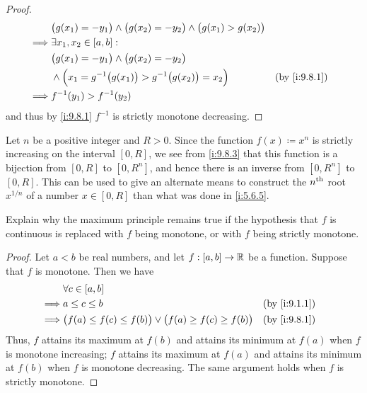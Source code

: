 \begin{proof}
\begin{align*}
             & \big(g(x_1) = -y_1\big) \land \big(g(x_2) = -y_2\big) \land \big(g(x_1) > g(x_2)\big)                     \\
    \implies & \exists x_1, x_2 \in [a, b] :                                                                             \\
             & \big(g(x_1) = -y_1\big) \land \big(g(x_2) = -y_2\big)                                                     \\
             & \land \Big(x_1 = g^{-1}\big(g(x_1)\big) > g^{-1}\big(g(x_2)\big) = x_2\Big)             &  & \by{i:9.8.1} \\
    \implies & f^{-1}(y_1) > f^{-1}(y_2)
  \end{align*}
  and thus by \cref{i:9.8.1} \(f^{-1}\) is strictly monotone decreasing.
\end{proof}

\begin{eg}\label{i:9.8.4}
  Let \(n\) be a positive integer and \(R > 0\).
  Since the function \(f(x) \coloneqq x^n\) is strictly increasing on the interval \([0, R]\), we see from \cref{i:9.8.3} that this function is a bijection from \([0, R]\) to \([0, R^n]\), and hence there is an inverse from \([0, R^n]\) to \([0, R]\).
  This can be used to give an alternate means to construct the \(n^{\operatorname{th}}\) root \(x^{1 / n}\) of a number \(x \in [0, R]\) than what was done in \cref{i:5.6.5}.
\end{eg}

\exercisesection

\begin{ex}\label{i:ex:9.8.1}
  Explain why the maximum principle remains true if the hypothesis that \(f\) is continuous is replaced with \(f\) being monotone, or with \(f\) being strictly monotone.
\end{ex}

\begin{proof}
  Let \(a < b\) be real numbers, and let \(f : [a, b] \to \mathbb{R}\) be a function.
  Suppose that \(f\) is monotone.
  Then we have
  \begin{align*}
             & \forall c \in [a, b]                                                                         \\
    \implies & a \leq c \leq b                                                            &  & \by{i:9.1.1} \\
    \implies & \big(f(a) \leq f(c) \leq f(b)\big) \lor \big(f(a) \geq f(c) \geq f(b)\big) &  & \by{i:9.8.1} \\
  \end{align*}
  Thus, \(f\) attains its maximum at \(f(b)\) and attains its minimum at \(f(a)\) when \(f\) is monotone increasing;
  \(f\) attains its maximum at \(f(a)\) and attains its minimum at \(f(b)\) when \(f\) is monotone decreasing.
  The same argument holds when \(f\) is strictly monotone.
\end{proof}

